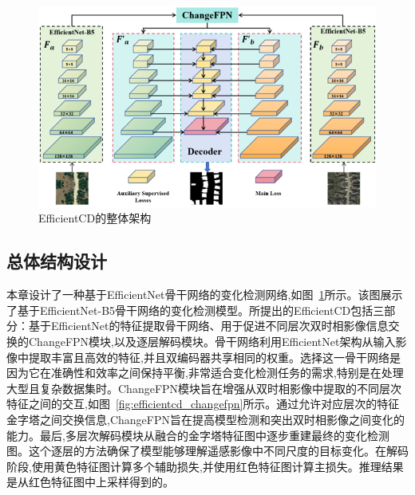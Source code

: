 \begin{figure}[!htbp]
  \centering
  \includegraphics[width=\textwidth]{paper_figures/基于双时相遥感影像特征交互的变化检测算法研究/EfficientCD/efficientcd.png}
  \caption{EfficientCD的整体架构}
  \label{fig:efficientcd}
\end{figure}

\subsection{总体结构设计}

本章设计了一种基于EfficientNet骨干网络的变化检测网络,如图~\ref{fig:efficientcd}所示。该图展示了基于EfficientNet-B5骨干网络的变化检测模型。所提出的EfficientCD包括三部分：基于EfficientNet的特征提取骨干网络、用于促进不同层次双时相影像信息交换的ChangeFPN模块,以及逐层解码模块。骨干网络利用EfficientNet架构从输入影像中提取丰富且高效的特征,并且双编码器共享相同的权重。选择这一骨干网络是因为它在准确性和效率之间保持平衡,非常适合变化检测任务的需求,特别是在处理大型且复杂数据集时。ChangeFPN模块旨在增强从双时相影像中提取的不同层次特征之间的交互,如图~\ref{fig:efficientcd_changefpn}所示。通过允许对应层次的特征金字塔之间交换信息,ChangeFPN旨在提高模型检测和突出双时相影像之间变化的能力。最后,多层次解码模块从融合的金字塔特征图中逐步重建最终的变化检测图。这个逐层的方法确保了模型能够理解遥感影像中不同尺度的目标变化。在解码阶段,使用黄色特征图计算多个辅助损失,并使用红色特征图计算主损失。推理结果是从红色特征图中上采样得到的。

